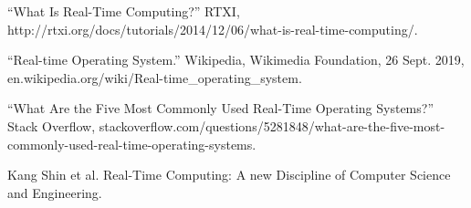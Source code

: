 \documentclass[letterpaper, 10 pt, conference]{IEEEconf}
\begin{document}
\begin{enumerate}[label={[\arabic*]}]
  \item “What Is Real-Time Computing?” RTXI, http://rtxi.org/docs/tutorials/2014/12/06/what-is-real-time-computing/.
  \item ``Real-time Operating System.'' Wikipedia, Wikimedia Foundation, 26 Sept. 2019, \\ en.wikipedia.org/wiki/Real-time\_operating\_system.
  \item “What Are the Five Most Commonly Used Real-Time Operating Systems?” Stack Overflow, stackoverflow.com/questions/5281848/what-are-the-five-most-commonly-used-real-time-operating-systems. 
  \item Kang Shin et al. Real-Time Computing: A new Discipline of Computer Science and Engineering.
\end{enumerate}
\end{document}
